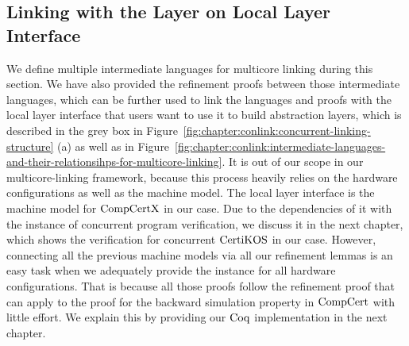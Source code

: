 
\subsection{Linking with the Layer on Local Layer Interface}
\label{chapter:linking:subsec:linking-with-the-layer-on-local-layer-interface}


We define multiple intermediate languages for multicore linking during this section.
We have also provided the refinement proofs between those intermediate languages, which can be further used to link the languages and proofs with the local layer interface that users want to use 
it to build abstraction layers, which is described in the grey box in Figure~\ref{fig:chapter:conlink:concurrent-linking-structure} (a) as well as in Figure~\ref{fig:chapter:conlink:intermediate-languages-and-their-relationsihps-for-multicore-linking}.
It is out of our scope in our multicore-linking framework,
because this process heavily relies on the hardware configurations as well as the machine model.
The local layer interface is the machine model for $\mathrm{CompCertX}$ in our case. 
Due to the dependencies of it with the instance of concurrent program verification, 
we discuss it in the next chapter, which shows the verification for concurrent $\mathrm{CertiKOS}$ in our case. 
However, connecting all the previous machine models via
all our refinement lemmas is an
easy task when we adequately provide the instance for all hardware configurations.
That is because all those proofs follow the refinement proof that can apply to the proof for the backward simulation property in $\mathrm{CompCert}$ with little effort. 
We explain this by providing our $\mathrm{Coq}$ implementation in the next chapter.
